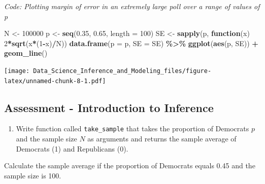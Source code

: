 \documentclass[
]{article}
\newenvironment{Shaded}{\begin{snugshade}}{\end{snugshade}}
\newcommand{\ControlFlowTok}[1]{\textcolor[rgb]{0.13,0.29,0.53}{\textbf{#1}}}
\newcommand{\DataTypeTok}[1]{\textcolor[rgb]{0.13,0.29,0.53}{#1}}
\newcommand{\DecValTok}[1]{\textcolor[rgb]{0.00,0.00,0.81}{#1}}
\newcommand{\FloatTok}[1]{\textcolor[rgb]{0.00,0.00,0.81}{#1}}
\newcommand{\KeywordTok}[1]{\textcolor[rgb]{0.13,0.29,0.53}{\textbf{#1}}}
\newcommand{\NormalTok}[1]{#1}
\newcommand{\OperatorTok}[1]{\textcolor[rgb]{0.81,0.36,0.00}{\textbf{#1}}}
\newcommand{\StringTok}[1]{\textcolor[rgb]{0.31,0.60,0.02}{#1}}
\providecommand{\tightlist}{%
  \setlength{\itemsep}{0pt}\setlength{\parskip}{0pt}}
\begin{document}
\emph{Code: Plotting margin of error in an extremely large poll over a
range of values of p}

\begin{Shaded}
\begin{Highlighting}[]
\NormalTok{N \textless{}{-}}\StringTok{ }\DecValTok{100000}
\NormalTok{p \textless{}{-}}\StringTok{ }\KeywordTok{seq}\NormalTok{(}\FloatTok{0.35}\NormalTok{, }\FloatTok{0.65}\NormalTok{, }\DataTypeTok{length =} \DecValTok{100}\NormalTok{)}
\NormalTok{SE \textless{}{-}}\StringTok{ }\KeywordTok{sapply}\NormalTok{(p, }\ControlFlowTok{function}\NormalTok{(x) }\DecValTok{2}\OperatorTok{*}\KeywordTok{sqrt}\NormalTok{(x}\OperatorTok{*}\NormalTok{(}\DecValTok{1}\OperatorTok{{-}}\NormalTok{x)}\OperatorTok{/}\NormalTok{N))}
\KeywordTok{data.frame}\NormalTok{(}\DataTypeTok{p =}\NormalTok{ p, }\DataTypeTok{SE =}\NormalTok{ SE) }\OperatorTok{\%\textgreater{}\%}
\StringTok{    }\KeywordTok{ggplot}\NormalTok{(}\KeywordTok{aes}\NormalTok{(p, SE)) }\OperatorTok{+}
\StringTok{    }\KeywordTok{geom\_line}\NormalTok{()}
\end{Highlighting}
\end{Shaded}

\texttt{[image: Data\_Science\_Inference\_and\_Modeling\_files/figure-latex/unnamed-chunk-8-1.pdf]}

\hypertarget{assessment---introduction-to-inference}{%
\subsection{Assessment - Introduction to
Inference}\label{assessment---introduction-to-inference}}

\begin{enumerate}
\def\labelenumi{\arabic{enumi}.}
\tightlist
\item
  Write function called \texttt{take\_sample} that takes the proportion
  of Democrats \(p\) and the sample size \(N\) as arguments and returns
  the sample average of Democrats (1) and Republicans (0).
\end{enumerate}

Calculate the sample average if the proportion of Democrats equals 0.45
and the sample size is 100.
\end{document}
